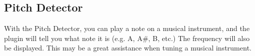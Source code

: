 
\subsection{Pitch Detector}

With the Pitch Detector, you can play a note on a musical instrument,
and the plugin will tell you what note it is (e.g. A, A\#, B, etc.) The
frequency will also be displayed. This may be a great assistance when
tuning a musical instrument.
